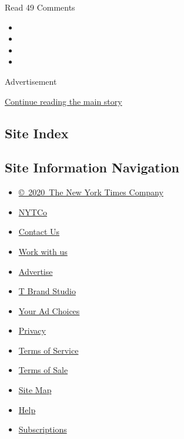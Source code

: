 Read 49 Comments

\begin{itemize}
\item
\item
\item
\item
\end{itemize}

Advertisement

\protect\hyperlink{after-bottom}{Continue reading the main story}

\hypertarget{site-index}{%
\subsection{Site Index}\label{site-index}}

\hypertarget{site-information-navigation}{%
\subsection{Site Information
Navigation}\label{site-information-navigation}}

\begin{itemize}
\tightlist
\item
  \href{https://help.nytimes3xbfgragh.onion/hc/en-us/articles/115014792127-Copyright-notice}{©~2020~The
  New York Times Company}
\end{itemize}

\begin{itemize}
\tightlist
\item
  \href{https://www.nytco.com/}{NYTCo}
\item
  \href{https://help.nytimes3xbfgragh.onion/hc/en-us/articles/115015385887-Contact-Us}{Contact
  Us}
\item
  \href{https://www.nytco.com/careers/}{Work with us}
\item
  \href{https://nytmediakit.com/}{Advertise}
\item
  \href{http://www.tbrandstudio.com/}{T Brand Studio}
\item
  \href{https://www.nytimes3xbfgragh.onion/privacy/cookie-policy\#how-do-i-manage-trackers}{Your
  Ad Choices}
\item
  \href{https://www.nytimes3xbfgragh.onion/privacy}{Privacy}
\item
  \href{https://help.nytimes3xbfgragh.onion/hc/en-us/articles/115014893428-Terms-of-service}{Terms
  of Service}
\item
  \href{https://help.nytimes3xbfgragh.onion/hc/en-us/articles/115014893968-Terms-of-sale}{Terms
  of Sale}
\item
  \href{https://spiderbites.nytimes3xbfgragh.onion}{Site Map}
\item
  \href{https://help.nytimes3xbfgragh.onion/hc/en-us}{Help}
\item
  \href{https://www.nytimes3xbfgragh.onion/subscription?campaignId=37WXW}{Subscriptions}
\end{itemize}
